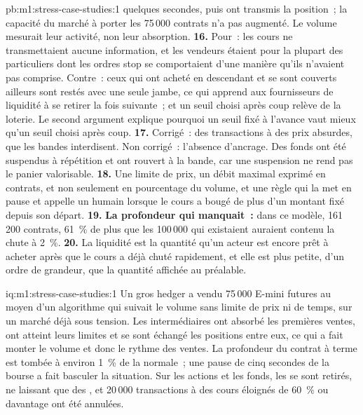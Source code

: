 \begin{solution}{pb:m1:stress-case-studies:1}
quelques secondes, puis ont transmis la position~; la capacité du marché à porter les
75\,000 contrats n'a pas augmenté. Le volume mesurait leur activité, non leur absorption.
\textbf{16.} Pour~: les cours ne transmettaient aucune information, et les vendeurs
étaient pour la plupart des particuliers dont les ordres stop se comportaient d'une manière qu'ils n'avaient pas comprise.
Contre~: ceux qui ont acheté en descendant et se sont couverts ailleurs sont restés avec
une seule jambe, ce qui apprend aux fournisseurs de liquidité à se retirer la fois suivante~; et un
seuil choisi après coup relève de la loterie. Le second argument explique pourquoi un
seuil fixé à l'avance vaut mieux qu'un seuil choisi après coup.
\textbf{17.} Corrigé~: des transactions à des prix absurdes, que les bandes interdisent. Non corrigé~:
l'absence d'ancrage. Des fonds ont été suspendus à répétition et ont rouvert à la
bande, car une suspension ne rend pas le panier valorisable.
\textbf{18.} Une limite de prix, un débit maximal exprimé en contrats, et non seulement en pourcentage
du volume, et une règle qui la met en pause et appelle un humain lorsque le cours a
bougé de plus d'un montant fixé depuis son départ.
\textbf{19.} \textbf{La profondeur qui manquait~:} dans ce modèle, 161\,200 contrats, 61~\%
de plus que les 100\,000 qui existaient auraient contenu la chute à 2~\%.
\textbf{20.} La liquidité est la quantité qu'un acteur est encore prêt à acheter après
que le cours a déjà chuté rapidement, et elle est plus petite, d'un ordre de
grandeur, que la quantité affichée au préalable.
\end{solution}

\begin{solution}{iq:m1:stress-case-studies:1}
Un gros hedger a vendu 75\,000 E-mini futures au moyen d'un algorithme qui suivait le volume sans limite de
prix ni de temps, sur un marché déjà sous tension. Les intermédiaires ont absorbé les premières
ventes, ont atteint leurs limites et se sont échangé les positions entre eux, ce qui a fait monter
le volume et donc le rythme des ventes. La profondeur du contrat à terme est tombée à environ 1~\%
de la normale~; une pause de cinq secondes de la bourse a fait basculer la situation. Sur les actions
et les fonds, les  se sont retirés, ne laissant que des , et 20\,000
transactions à des cours éloignés de 60~\% ou davantage ont été annulées.
\end{solution}

